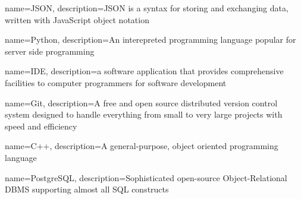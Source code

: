 {
        name=JSON,
        description={JSON is a syntax for storing and exchanging data, written with JavaScript object notation}
}

{
        name=Python,
        description={An interepreted programming language popular for server side programming}
}

{
        name=IDE,
        description={a software application that provides comprehensive facilities to computer programmers for software development}
}

{
        name=Git,
        description={A free and open source distributed version control system designed to handle everything from small to very large projects with speed and efficiency}
}

{
        name=C++,
        description={A general-purpose, object oriented programming language}
}

{
        name=PostgreSQL,
        description={Sophisticated open-source Object-Relational DBMS supporting almost all SQL constructs}
}

